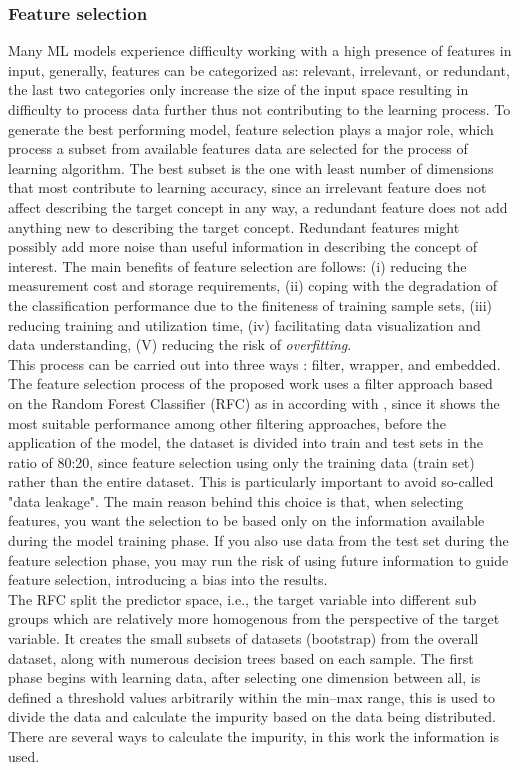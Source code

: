 \documentclass[runningheads]{llncs}
\begin{document}
\subsubsection{Feature selection}
Many ML models experience difficulty working with a high presence of features in input, generally, features can be categorized as: relevant, irrelevant, or redundant, the last two categories only increase the size of the input space \cite{ref_paper9} resulting in difficulty to process data further thus not contributing to the learning process. To generate the best performing model, feature selection plays a major role, which process a subset from available features data are selected for the process of learning algorithm. The best subset is the one with least number of dimensions that most contribute to learning accuracy, since an irrelevant feature does not affect describing the target concept in any way, a redundant feature does not add anything new to describing the target concept. Redundant features might possibly add more noise than useful information in describing the concept of interest. The main benefits of feature selection are follows: (i) reducing the measurement cost and storage requirements, (ii) coping with the degradation of the classification performance due to the finiteness of training sample sets, (iii) reducing training and utilization time, (iv) facilitating data visualization and data understanding, (V) reducing the risk of \textit{overfitting}.\\
This process can be carried out into three ways \cite{paper_feature_selection}: filter, wrapper, and embedded.\\The feature selection process of the proposed work uses a filter approach based on the Random Forest Classifier (RFC) as in according with \cite{paper_rfc}, since it shows the most suitable performance among other filtering approaches, before the application of the model, the dataset is divided into train and test sets in the ratio of 80:20, since feature selection using only the training data (train set) rather than the entire dataset. This is particularly important to avoid so-called "data leakage".
The main reason behind this choice is that, when selecting features, you want the selection to be based only on the information available during the model training phase. If you also use data from the test set during the feature selection phase, you may run the risk of using future information to guide feature selection, introducing a bias into the results.\\
The RFC split the predictor space, i.e., the target variable into different sub groups which are relatively more homogenous from the perspective of the target variable. It creates the small subsets of datasets (bootstrap) from the overall dataset, along with numerous decision trees based on each sample. The first phase begins with learning data, after selecting one dimension between all, is defined a threshold values arbitrarily within the min–max range, this is used to divide the data and calculate the impurity based on the data being distributed. There are several ways to calculate the impurity, in this work the information is used.\\
\end{document}
